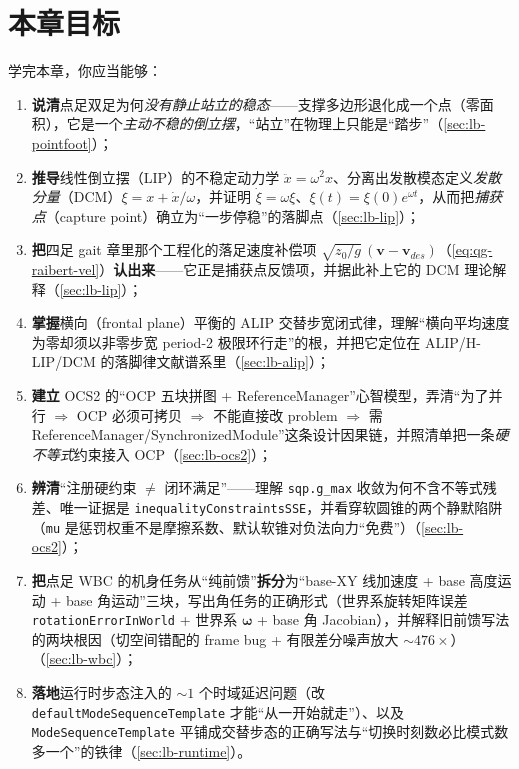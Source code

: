\section*{本章目标}
学完本章，你应当能够：
\begin{enumerate}
  \item \textbf{说清}点足双足为何\emph{没有静止站立的稳态}——支撑多边形退化成一个点（零面积），它是一个\emph{主动不稳的倒立摆}，“站立”在物理上只能是“踏步”（\cref{sec:lb-pointfoot}）；
  \item \textbf{推导}线性倒立摆（LIP）的不稳定动力学 $\ddot x=\omega^2 x$、分离出发散模态定义\emph{发散分量}（DCM）$\xi=x+\dot x/\omega$，并证明 $\dot\xi=\omega\xi$、$\xi(t)=\xi(0)e^{\omega t}$，从而把\emph{捕获点}（capture point）确立为“一步停稳”的落脚点（\cref{sec:lb-lip}）；
  \item \textbf{把}四足 gait 章里那个工程化的落足速度补偿项 $\sqrt{z_0/g}\,(\mathbf{v}-\mathbf{v}_{des})$（\cref{eq:qg-raibert-vel}）\textbf{认出来}——它正是捕获点反馈项，并据此补上它的 DCM 理论解释（\cref{sec:lb-lip}）；
  \item \textbf{掌握}横向（frontal plane）平衡的 ALIP 交替步宽闭式律，理解“横向平均速度为零却须以非零步宽 period-2 极限环行走”的根，并把它定位在 ALIP/H-LIP/DCM 的落脚律文献谱系里（\cref{sec:lb-alip}）；
  \item \textbf{建立} OCS2 的“OCP 五块拼图 + ReferenceManager”心智模型，弄清“为了并行 $\Rightarrow$ OCP 必须可拷贝 $\Rightarrow$ 不能直接改 problem $\Rightarrow$ 需 ReferenceManager/SynchronizedModule”这条设计因果链，并照清单把一条\emph{硬不等式}约束接入 OCP（\cref{sec:lb-ocs2}）；
  \item \textbf{辨清}“注册硬约束 $\ne$ 闭环满足”——理解 \texttt{sqp.g\_max} 收敛为何不含不等式残差、唯一证据是 \texttt{inequalityConstraintsSSE}，并看穿软圆锥的两个静默陷阱（\texttt{mu} 是惩罚权重不是摩擦系数、默认软锥对负法向力“免费”）（\cref{sec:lb-ocs2}）；
  \item \textbf{把}点足 WBC 的机身任务从“纯前馈”\textbf{拆分}为“base-XY 线加速度 + base 高度运动 + base 角运动”三块，写出角任务的正确形式（世界系旋转矩阵误差 \texttt{rotationErrorInWorld} + 世界系 $\boldsymbol\omega$ + base 角 Jacobian），并解释旧前馈写法的两块根因（切空间错配的 frame bug + 有限差分噪声放大 $\sim 476\times$）（\cref{sec:lb-wbc}）；
  \item \textbf{落地}运行时步态注入的 $\sim 1$ 个时域延迟问题（改 \texttt{defaultModeSequenceTemplate} 才能“从一开始就走”）、以及 \texttt{ModeSequenceTemplate} 平铺成交替步态的正确写法与“切换时刻数必比模式数多一个”的铁律（\cref{sec:lb-runtime}）。
\end{enumerate}


